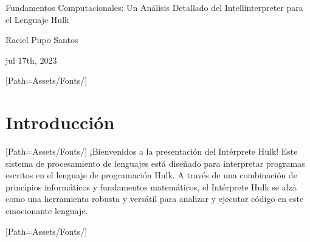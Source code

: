 \documentclass{article}
\begin{document}
\begin{titlepage}

\begin{flushright}

\vspace{3cm}

\Huge Fundamentos Computacionales: Un Análisis Detallado del Intellinterpreter para el Lenguaje Hulk

\vspace{1.5cm}

\Large Raciel Pupo Santos

\vspace{5cm}

\normalsize jul 17th, 2023

\end{flushright}

\end{titlepage}
\newpage
\tableofcontents
\newpage
\setmainfont{LEMONMILK-Bold.otf}[Path=Assets/Fonts/]
\section{Introducción}
    \setmainfont{LEMONMILK-Regular.otf}[Path=Assets/Fonts/]
    ¡Bienvenidos a la presentación del Intérprete Hulk! Este sistema de procesamiento de lenguajes está diseñado para interpretar programas escritos en el lenguaje de programación Hulk. A través de una combinación de principios informáticos y fundamentos matemáticos, el Intérprete Hulk se alza como una herramienta robusta y versátil para analizar y ejecutar código en este emocionante lenguaje.
\newpage

\setmainfont{LEMONMILK-Bold.otf}[Path=Assets/Fonts/]
\end{document}
